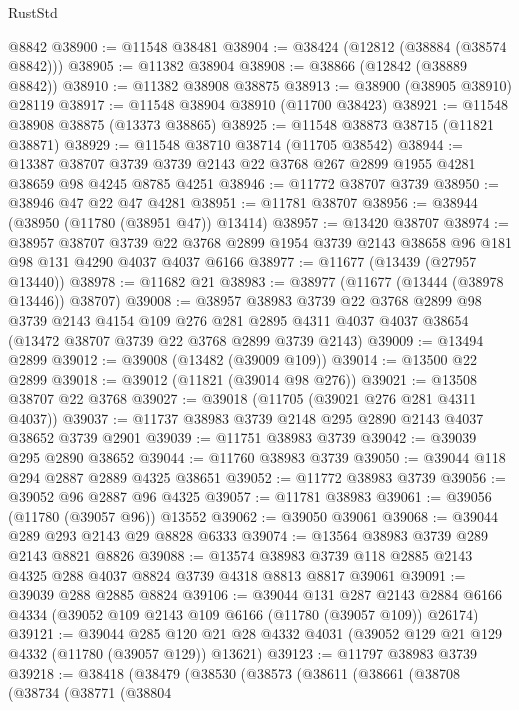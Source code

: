 \begin{lexlean}{RustStd}
\begin{coremodule}
    @8842
@38900 := @11548 @38481
@38904 := @38424 (@12812 (@38884 (@38574 @8842)))
@38905 := @11382 @38904
@38908 := @38866 (@12842 (@38889 @8842))
@38910 := @11382 @38908 @38875
@38913 := @38900 (@38905 @38910) @28119
@38917 := @11548 @38904 @38910 (@11700 @38423)
@38921 := @11548 @38908 @38875 (@13373 @38865)
@38925 := @11548 @38873 @38715 (@11821 @38871)
@38929 := @11548 @38710 @38714 (@11705 @38542)
@38944 := @13387
    @38707
    @3739
    @3739
    @2143
    @22
    @3768
    @267
    @2899
    @1955
    @4281
    @38659
    @98
    @4245
    @8785
    @4251
@38946 := @11772 @38707 @3739
@38950 := @38946 @47 @22 @47 @4281
@38951 := @11781 @38707
@38956 := @38944 (@38950 (@11780 (@38951 @47)) @13414)
@38957 := @13420 @38707
@38974 := @38957
    @38707
    @3739
    @22
    @3768
    @2899
    @1954
    @3739
    @2143
    @38658
    @96
    @181
    @98
    @131
    @4290
    @4037
    @4037
    @6166
@38977 := @11677 (@13439 (@27957 @13440))
@38978 := @11682 @21
@38983 := @38977 (@11677 (@13444 (@38978 @13446)) @38707)
@39008 := @38957
    @38983
    @3739
    @22
    @3768
    @2899
    @98
    @3739
    @2143
    @4154
    @109
    @276
    @281
    @2895
    @4311
    @4037
    @4037
    @38654
    (@13472 @38707 @3739 @22 @3768 @2899 @3739 @2143)
@39009 := @13494 @2899
@39012 := @39008 (@13482 (@39009 @109))
@39014 := @13500 @22 @2899
@39018 := @39012 (@11821 (@39014 @98 @276))
@39021 := @13508 @38707 @22 @3768
@39027 := @39018 (@11705 (@39021 @276 @281 @4311 @4037))
@39037 := @11737 @38983 @3739 @2148 @295 @2890 @2143 @4037 @38652 @3739 @2901
@39039 := @11751 @38983 @3739
@39042 := @39039 @295 @2890 @38652
@39044 := @11760 @38983 @3739
@39050 := @39044 @118 @294 @2887 @2889 @4325 @38651
@39052 := @11772 @38983 @3739
@39056 := @39052 @96 @2887 @96 @4325
@39057 := @11781 @38983
@39061 := @39056 (@11780 (@39057 @96)) @13552
@39062 := @39050 @39061
@39068 := @39044 @289 @293 @2143 @29 @8828 @6333
@39074 := @13564 @38983 @3739 @289 @2143 @8821 @8826
@39088 := @13574 @38983 @3739 @118 @2885 @2143 @4325 @288 @4037 @8824 @3739 @4318 @8813 @8817 @39061
@39091 := @39039 @288 @2885 @8824
@39106 := @39044
    @131
    @287
    @2143
    @2884
    @6166
    @4334
    (@39052 @109 @2143 @109 @6166 (@11780 (@39057 @109)) @26174)
@39121 := @39044
    @285
    @120
    @21
    @28
    @4332
    @4031
    (@39052 @129 @21 @129 @4332 (@11780 (@39057 @129)) @13621)
@39123 := @11797 @38983 @3739
@39218 := @38418
    (@38479
      (@38530
        (@38573
          (@38611
            (@38661
              (@38708
                (@38734
                  (@38771
                    (@38804

\end{coremodule}
\end{lexlean}

